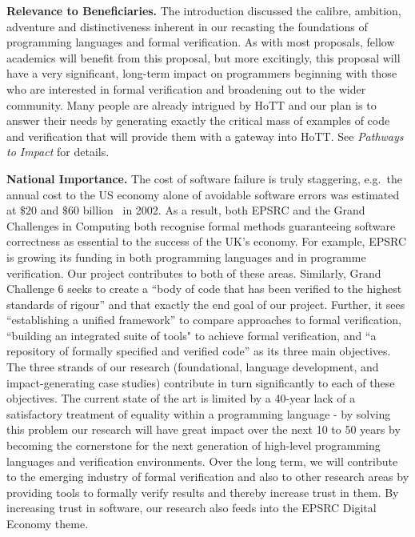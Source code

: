 \documentclass[a4paper,11pt]{article}
\newcommand{\eg}{{e.g.}\ }
\begin{document}
\vspace*{-0.1in}


{\bf Relevance to Beneficiaries.} The introduction discussed the
calibre, ambition, adventure and distinctiveness inherent in our
recasting the foundations of programming languages and formal
verification. As with most proposals, fellow academics will benefit
from this proposal, but more excitingly, this proposal will have a
very significant, long-term impact on programmers beginning with those
who are interested in formal verification and broadening out to the
wider community. Many people are
already intrigued by HoTT and our plan is to answer their needs by
generating exactly the critical mass of examples of code and
verification that will provide them with a gateway into HoTT. See {\em
  Pathways to Impact} for details. 
 

{\bf National Importance.} %
The cost of software failure is truly staggering, \eg the annual cost
to the US economy alone of avoidable software errors was estimated at
$\$ 20$ and $\$60$ billion~\cite{grandchallenges} in 2002.  As a
result, both EPSRC and the Grand Challenges in Computing both
recognise formal methods guaranteeing software correctness as
essential to the success of the UK's economy. For example, EPSRC is
growing its funding in both programming languages and in programme
verification. Our project contributes to both of these
areas. Similarly, Grand Challenge 6 seeks to create a ``body of code
that has been verified to the highest standards of rigour'' and that
exactly the end goal of our project. Further, it sees ``establishing a
unified framework'' to compare approaches to formal verification,
``building an integrated suite of tools" to achieve formal
verification, and ``a repository of formally specified and verified
code'' as its three main objectives. The three strands of our research
(foundational, language development, and impact-generating
case studies) contribute in turn significantly to each of these objectives.
The current state of the art is limited by a 40-year lack of a
satisfactory treatment of equality within a programming language - by
solving this problem our research will have great impact over the next
10 to 50 years by becoming the cornerstone for the next generation of
high-level programming languages and verification environments.  Over
the long term, we will contribute to the emerging industry of formal
verification and also to other research areas by providing tools to
formally verify results and thereby increase trust in them. By
increasing trust in software, our research also feeds into the EPSRC
Digital Economy theme.
\end{document}
